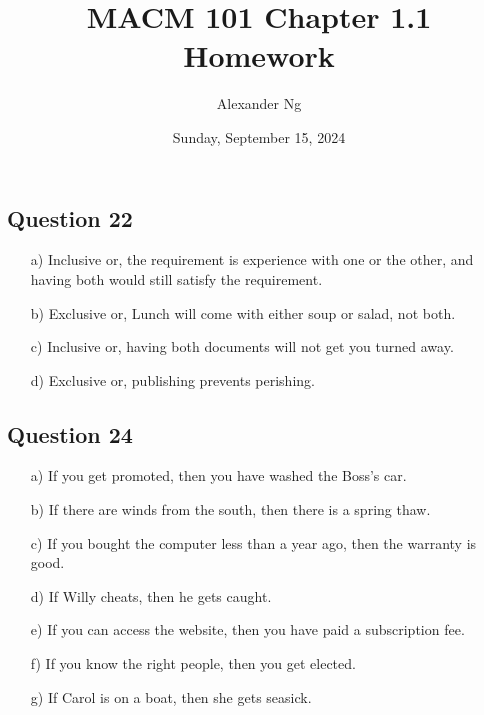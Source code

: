 \documentclass[12pt]{article}
\begin{document}
\title{MACM 101 Chapter 1.1 Homework}
\author{Alexander Ng}
\date{Sunday, September 15, 2024}

\maketitle

\subsection*{Question 22}
\begin{itemize}
    \item[a)] Inclusive or, the requirement is experience with one or the other,
      and having both would still satisfy the requirement.
    \item[b)] Exclusive or, Lunch will come with either soup or salad, not both.
    \item[c)] Inclusive or, having both documents will not get you turned away.
    \item[d)] Exclusive or, publishing prevents perishing.
\end{itemize}

\subsection*{Question 24}
\begin{itemize}
    \item[a)] If you get promoted, then you have washed the Boss's car.
    \item[b)] If there are winds from the south, then there is a spring thaw.
    \item[c)] If you bought the computer less than a year ago, then the warranty
      is good.
    \item[d)] If Willy cheats, then he gets caught.
    \item[e)] If you can access the website, then you have paid a subscription
      fee.
    \item[f)] If you know the right people, then you get elected.
    \item[g)] If Carol is on a boat, then she gets seasick.
\end{itemize}
\end{document}

